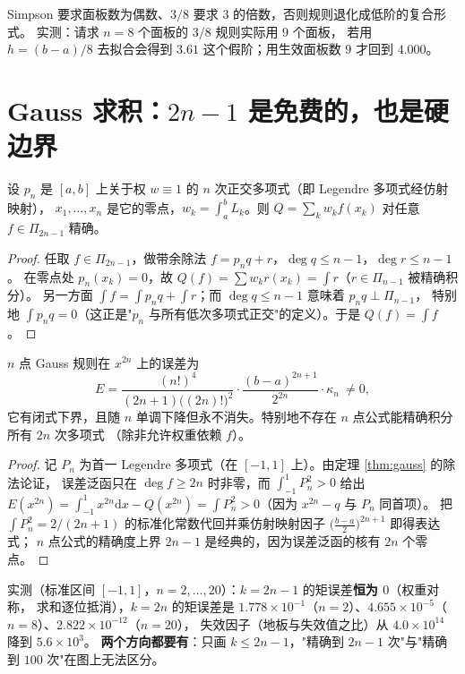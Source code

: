 \begin{corollary}[生效面板数]
Simpson 要求面板数为偶数、$3/8$ 要求 $3$ 的倍数，否则规则退化成低阶的复合形式。
实测：请求 $n=8$ 个面板的 $3/8$ 规则实际用 $9$ 个面板，
若用 $h=(b-a)/8$ 去拟合会得到 $3.61$ 这个假阶；用生效面板数 $9$ 才回到 $4.000$。
\end{corollary}

\section{Gauss 求积：$2n-1$ 是免费的，也是硬边界}

\begin{theorem}[Gauss 求积]
\label{thm:gauss}
设 $p_n$ 是 $[a,b]$ 上关于权 $w\equiv1$ 的 $n$ 次正交多项式（即 Legendre 多项式经仿射映射），
$x_1,\dots,x_n$ 是它的零点，$w_k=\int_a^b L_k$。则 $Q=\sum_k w_kf(x_k)$ 对任意
$f\in\Pi_{2n-1}$ 精确。
\end{theorem}

\begin{proof}
任取 $f\in\Pi_{2n-1}$，做带余除法 $f=p_nq+r$，$\deg q\le n-1$，$\deg r\le n-1$。
在零点处 $p_n(x_k)=0$，故 $Q(f)=\sum w_kr(x_k)=\int r$（$r\in\Pi_{n-1}$ 被精确积分）。
另一方面 $\int f=\int p_nq+\int r$；而 $\deg q\le n-1$ 意味着 $p_nq\perp\Pi_{n-1}$，
特别地 $\int p_nq=0$（这正是"$p_n$ 与所有低次多项式正交"的定义）。于是 $Q(f)=\int f$。
\end{proof}

\begin{theorem}[$2n-1$ 是硬边界]
\label{thm:sharp}
$n$ 点 Gauss 规则在 $x^{2n}$ 上的误差为
\[
  E=\frac{(n!)^4}{(2n+1)\bigl((2n)!\bigr)^2}\cdot\frac{(b-a)^{2n+1}}{2^{2n}}\cdot\kappa_n\ \ne 0,
\]
它有闭式下界，且随 $n$ 单调下降但永不消失。特别地不存在 $n$ 点公式能精确积分所有 $2n$ 次多项式
（除非允许权重依赖 $f$）。
\end{theorem}

\begin{proof}
记 $P_n$ 为首一 Legendre 多项式（在 $[-1,1]$ 上）。由定理 \ref{thm:gauss} 的除法论证，
误差泛函只在 $\deg f\ge2n$ 时非零，而 $\int_{-1}^1P_n^2>0$ 给出
$E(x^{2n})=\int_{-1}^1x^{2n}\mathrm{d}x-Q(x^{2n})=\int P_n^2>0$（因为 $x^{2n}-q$ 与 $P_n$ 同首项）。
把 $\int P_n^2=2/(2n+1)$ 的标准化常数代回并乘仿射映射因子 $\bigl(\tfrac{b-a}2\bigr)^{2n+1}$ 即得表达式；
$n$ 点公式的精确度上界 $2n-1$ 是经典的，因为误差泛函的核有 $2n$ 个零点。
\end{proof}

实测（标准区间 $[-1,1]$，$n=2,\dots,20$）：$k=2n-1$ 的矩误差\textbf{恒为 $0$}（权重对称，
求和逐位抵消），$k=2n$ 的矩误差是
$1.778\times10^{-1}$（$n=2$）、$4.655\times10^{-5}$（$n=8$）、$2.822\times10^{-12}$（$n=20$），
失效因子（地板与失效值之比）从 $4.0\times10^{14}$ 降到 $5.6\times10^{3}$。
\textbf{两个方向都要有}：只画 $k\le2n-1$，"精确到 $2n-1$ 次"与"精确到 $100$ 次"在图上无法区分。

